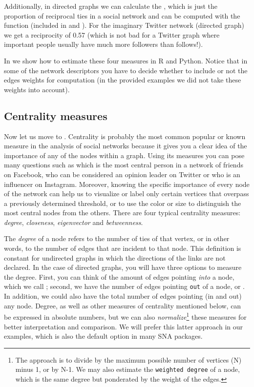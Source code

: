 Additionally, in directed graphs we can calculate the , which is just the proportion of reciprocal ties in a social network and can be computed with the function  (included in  and ). For the imaginary Twitter network (directed graph) we get a reciprocity of 0.57 (which is not bad for a Twitter graph where important people usually have much more followers than follows!).

In  we show how to estimate these four measures in R and Python. Notice that in some of the network descriptors you have to decide whether to include or not the edges weights for computation (in the provided examples we did not take these weights into account).


\subsection{Centrality measures}

Now let us move to . Centrality is probably the most common popular or known measure in the analysis of social networks because it gives you a clear idea of the importance of any of the nodes within a graph. Using its measures you can pose many questions such as which is the most central person in a network of friends on Facebook, who can be considered an opinion leader on Twitter or who is an influencer on Instagram. Moreover, knowing the specific importance of every node of the network can help us to visualize or label only certain vertices that overpass a previously determined threshold, or to use the color or size to distinguish the most central nodes from the others. There are four typical centrality measures: \emph{degree}, \emph{closeness}, \emph{eigenvector} and \emph{betweenness}.

The \emph{degree} of a node refers to the number of ties of that vertex, or in other words, to the number of edges that are incident to that node. This definition is constant for undirected graphs in which the directions of the links are not declared. In the case of directed graphs, you will have three options to measure the degree. First, you can think of the amount of edges pointing \emph{into} a node, which we call ; second, we have the number of edges pointing \texttt{out} of a node, or . In addition, we could also have the total number of edges pointing (in and out) any node. Degree, as well as other measures of centrality mentioned below, can be expressed in absolute numbers, but we can also \emph{normalize}\footnote{The approach is to divide by the maximum possible number of vertices (N) minus 1, or by N-1. We may also estimate the \texttt{weighted degree} of a node, which is the same degree but ponderated by the weight of the edges.}  these measures for better interpretation and comparison. We will prefer this latter approach in our examples, which is also the default option in many SNA packages.

